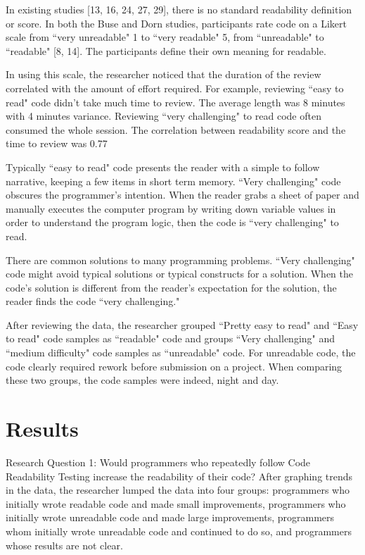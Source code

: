 \documentclass[conference]{IEEEtran}
\begin{document}
In existing studies [13, 16, 24, 27, 29], there is no standard readability definition or score. In both the Buse and Dorn studies, participants rate code on a Likert scale from ``very unreadable" 1 to ``very readable" 5, from ``unreadable" to ``readable" [8, 14]. The participants define their own meaning for readable.

In using this scale, the researcher noticed that the duration of the review correlated with the amount of effort required. For example, reviewing ``easy to read" code didn’t take much time to review. The average length was 8 minutes with 4 minutes variance. Reviewing ``very challenging" to read code often consumed the whole session. The correlation between readability score and the time to review was 0.77

Typically ``easy to read" code presents the reader with a simple to follow narrative, keeping a few items in short term memory. ``Very challenging" code obscures the programmer’s intention. When the reader grabs a sheet of paper and manually executes the computer program by writing down variable values in order to understand the program logic, then the code is ``very challenging" to read.

There are common solutions to many programming problems. ``Very challenging" code might avoid typical solutions or typical constructs for a solution. When the code’s solution is different from the reader’s expectation for the solution, the reader finds the code ``very challenging."

After reviewing the data, the researcher grouped ``Pretty easy to read" and ``Easy to read" code samples as ``readable" code and groups ``Very challenging" and ``medium difficulty" code samples as ``unreadable" code. For unreadable code, the code clearly required rework before submission on a project. When comparing these two groups, the code samples were indeed, night and day.

\section{Results}
Research Question 1: Would programmers who repeatedly follow Code Readability Testing increase the readability of their code?
After graphing trends in the data, the researcher lumped the data into four groups: programmers who initially wrote readable code and made small improvements, programmers who initially wrote unreadable code and made large improvements, programmers whom initially wrote unreadable code and continued to do so, and programmers whose results are not clear.
\end{document}
